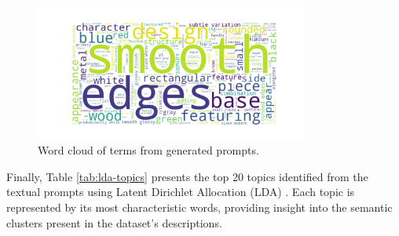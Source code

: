 \begin{figure}[h]
  \centering
  \includegraphics[width=0.8\textwidth]{images/data/objaverse_visualizations/wordcloud_prompts.jpeg}
  \caption{Word cloud of terms from generated prompts.}
  \label{fig:wordcloud-prompts}
\end{figure}

Finally, Table \ref{tab:lda-topics} presents the top 20 topics identified from the textual prompts using Latent Dirichlet Allocation (LDA) \cite{lda}. Each topic is represented by its most characteristic words, providing insight into the semantic clusters present in the dataset's descriptions.

